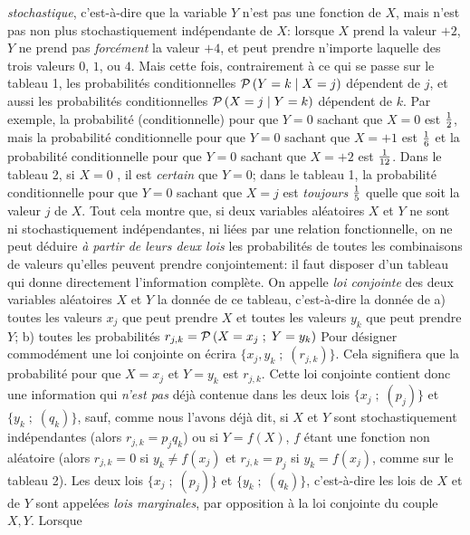 {\it stochastique}, c'est-\`a-dire que la variable $Y$ n'est pas une
fonction de $X$, mais n'est pas non plus stochastiquement ind\'ependante  
de $X$: lorsque $X$ prend la valeur $+2$, $Y$ ne prend pas {\it forc\'ement}
la valeur $+4$, et peut prendre n'importe laquelle des trois valeurs
$0$, $1$, ou $4$. Mais cette fois, contrairement \`a ce qui se passe sur le
tableau 1, les probabilit\'es conditionnelles ${\cal P}\, (Y = k \mid X = j)$
d\'ependent de $j$, et aussi les probabilit\'es conditionnelles ${\cal P}\,  
(X = j \mid Y = k)$ d\'ependent de $k$. Par exemple, la probabilit\'e
(conditionnelle) pour que $Y=0$ sachant que $X=0$ est ${1 \over 2}$, mais
la probabilit\'e conditionnelle pour que $Y=0$ sachant que $X=+1$ est ${1
\over 6}$ et la probabilit\'e conditionnelle pour que $Y=0$ sachant que
$X=+2$ est ${1 \over 12}$. Dans le tableau 2, si $X=0$ , il est {\it
certain} que $Y=0$; dans le tableau 1,  la probabilit\'e conditionnelle pour 
que $Y=0$ sachant que $X=j$ est {\it toujours} ${1 \over 5}$ quelle que
soit la valeur $j$ de $X$.
\bigskip
Tout cela montre que, si deux variables al\'eatoires $X$ et $Y$ ne sont 
ni stochastiquement ind\'ependantes, ni li\'ees par une relation 
fonctionnelle, on ne peut d\'eduire {\it \`a partir de leurs deux lois} les
probabilit\'es de toutes les combinaisons de valeurs qu'elles peuvent
prendre conjointement: il faut disposer d'un tableau qui donne  
directement l'information compl\`ete. On appelle {\it loi conjointe} 
des deux variables al\'eatoires $X$ et $Y$ la donn\'ee de ce tableau,
c'est-\`a-dire la donn\'ee de   
\smallskip
a) toutes les valeurs $x_j$ que peut prendre $X$ et toutes les valeurs
$y_k$ que peut prendre $Y$;
\smallskip
b) toutes les probabilit\'es $r_{j,k} = {\cal P}\, (X=x_j \; ; \; Y=y_k)$
\medskip
Pour d\'esigner commod\'ement une loi conjointe on \'ecrira $\{ x_j, y_k
\; ; \;  (r_{j,k})\}$. Cela signifiera que la probabilit\'e pour que $X=x_j$ 
et $Y=y_k$ est $r_{j,k}$. Cette loi conjointe contient donc une information
qui {\it n'est pas}  d\'ej\`a contenue dans les deux lois $\{ x_j \; ; \; (p_j)
\}$ et $\{ y_k \; ;  \; (q_k) \}$, sauf, comme nous l'avons d\'ej\`a dit, si 
$X$ et $Y$ sont stochastiquement ind\'ependantes (alors $r_{j,k} = p_j
q_k$) ou si $Y = f(X)$, $f$ \'etant une fonction non al\'eatoire (alors
$r_{j,k} = 0$ si $y_k \neq f(x_j)$ et $r_{j,k} = p_j$ si $y_k = f(x_j)$,
comme sur le  tableau 2). 
\medskip
Les deux lois $\{ x_j \; ; \; (p_j)\}$ et $\{ y_k \; ;  \; (q_k) \}$,
c'est-\`a-dire les lois de $X$ et de $Y$ sont appel\'ees {\it lois 
marginales}, par opposition \`a la loi conjointe du couple $X,Y$. Lorsque 
